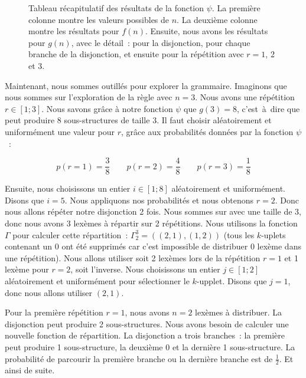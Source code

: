 \begin{example}
\begin{figure}
\caption{\label{figure:data:random_tabular} Tableau récapitulatif des résultats
de la fonction $\psi$. La première colonne montre les valeurs possibles de $n$.
La deuxième colonne montre les résultats pour $f(n)$. Ensuite, nous avons les
résultats pour $g(n)$, avec le détail~: pour la disjonction, pour chaque branche
de la disjonction, et ensuite pour la répétition avec $r = 1$, 2 et 3.}

\end{figure}

Maintenant, nous sommes outillés pour explorer la grammaire. Imaginons que nous
sommes sur l'exploration de la règle  avec $n = 3$. Nous avons une
répétition $r \in [1; 3]$. Nous savons grâce à notre fonction $\psi$ que $g(3) =
8$, c'est~à~dire que  peut produire 8 sous-structures de taille 3. Il
faut choisir aléatoirement et uniformément une valeur pour $r$, grâce aux
probabilités données par la fonction $\psi$~:

$$
p(r = 1) = \frac{3}{8} \qquad
p(r = 2) = \frac{4}{8} \qquad
p(r = 3) = \frac{1}{8}
$$

Ensuite, nous choisissons un entier $i \in [1; 8]$ aléatoirement et
uniformément. Disons que $i = 5$. Nous appliquons nos probabilités et nous
obtenons $r = 2$.
%
%
%
%
%
%
%
%
Donc nous allons répéter notre disjonction 2 fois. Nous sommes sur  avec
une taille de 3, donc nous avons 3 lexèmes à répartir sur 2 répétitions. Nous
utilisons la fonction $\Gamma$ pour calculer cette répartition~: $\Gamma_2^3 =
((2, 1), (1, 2))$ (tous les $k$-uplets contenant un 0 ont été supprimés car
c'est impossible de distribuer 0 lexème dans une répétition). Nous allons
utiliser soit 2 lexèmes lors de la répétition $r = 1$ et 1 lexème pour $r = 2$,
soit l'inverse. Nous choisissons un entier $j \in [1; 2]$ aléatoirement et
uniformément pour sélectionner le $k$-upplet. Disons que $j = 1$, donc nous
allons utiliser $(2, 1)$.

Pour la première répétition $r = 1$, nous avons $n = 2$ lexèmes à distribuer. La
disjonction peut produire 2 sous-structures. Nous avons besoin de calculer une
nouvelle fonction de répartition. La disjonction a trois branches~: la première
peut produire 1 sous-structure, la deuxième 0 et la dernière 1 sous-structure.
La probabilité de parcourir la première branche ou la dernière branche est de
$\tfrac{1}{2}$. Et ainsi de suite.

\end{example}


